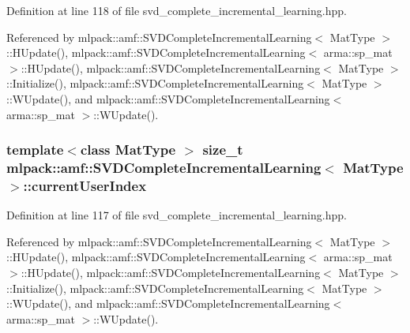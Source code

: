 Definition at line 118 of file svd\-\_\-complete\-\_\-incremental\-\_\-learning.\-hpp.



Referenced by mlpack\-::amf\-::\-S\-V\-D\-Complete\-Incremental\-Learning$<$ Mat\-Type $>$\-::\-H\-Update(), mlpack\-::amf\-::\-S\-V\-D\-Complete\-Incremental\-Learning$<$ arma\-::sp\-\_\-mat $>$\-::\-H\-Update(), mlpack\-::amf\-::\-S\-V\-D\-Complete\-Incremental\-Learning$<$ Mat\-Type $>$\-::\-Initialize(), mlpack\-::amf\-::\-S\-V\-D\-Complete\-Incremental\-Learning$<$ Mat\-Type $>$\-::\-W\-Update(), and mlpack\-::amf\-::\-S\-V\-D\-Complete\-Incremental\-Learning$<$ arma\-::sp\-\_\-mat $>$\-::\-W\-Update().

\subsubsection[{current\-User\-Index}]{\setlength{\rightskip}{0pt plus 5cm}template$<$class Mat\-Type $>$ size\-\_\-t {\bf mlpack\-::amf\-::\-S\-V\-D\-Complete\-Incremental\-Learning}$<$ Mat\-Type $>$\-::current\-User\-Index\hspace{0.3cm}{\ttfamily [private]}}\label{classmlpack_1_1amf_1_1SVDCompleteIncrementalLearning_ae98eaefa434c4e98e6d9459f0b7d0022}


Definition at line 117 of file svd\-\_\-complete\-\_\-incremental\-\_\-learning.\-hpp.



Referenced by mlpack\-::amf\-::\-S\-V\-D\-Complete\-Incremental\-Learning$<$ Mat\-Type $>$\-::\-H\-Update(), mlpack\-::amf\-::\-S\-V\-D\-Complete\-Incremental\-Learning$<$ arma\-::sp\-\_\-mat $>$\-::\-H\-Update(), mlpack\-::amf\-::\-S\-V\-D\-Complete\-Incremental\-Learning$<$ Mat\-Type $>$\-::\-Initialize(), mlpack\-::amf\-::\-S\-V\-D\-Complete\-Incremental\-Learning$<$ Mat\-Type $>$\-::\-W\-Update(), and mlpack\-::amf\-::\-S\-V\-D\-Complete\-Incremental\-Learning$<$ arma\-::sp\-\_\-mat $>$\-::\-W\-Update().

